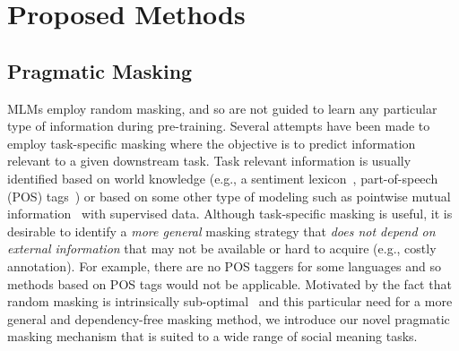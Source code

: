 \vspace{-5pt}
\section{Proposed Methods}\label{sec:method}
\vspace{-3pt}
% 

\subsection{Pragmatic Masking}\label{sec:prag_masking} 
MLMs employ random masking, and so are not guided to learn any particular type of information during pre-training. Several attempts have been made to employ task-specific masking where the objective is to predict information relevant to a given downstream task. Task relevant information is usually identified based on world knowledge (e.g., a sentiment lexicon~\cite{gu-2020-train,ke-2020-sentilare}, part-of-speech (POS) tags~\cite{zhou-2020-limit}) or based on some other type of modeling such as pointwise mutual information~\cite{tian-2020-skep} with supervised data. Although task-specific masking is useful, it is desirable to identify a \textit{more general} masking strategy that \textit{does not depend on external information} that may not be available or hard to acquire (e.g., costly annotation). For example, there are no POS taggers for some languages and so methods based on POS tags would not be applicable. Motivated by the fact that random masking is intrinsically sub-optimal~\cite{ke-2020-sentilare,kawintiranon-2021-knowledge} and this particular need for a more general and dependency-free masking method, we introduce our novel pragmatic masking mechanism that is suited to a wide range of social meaning tasks. %


